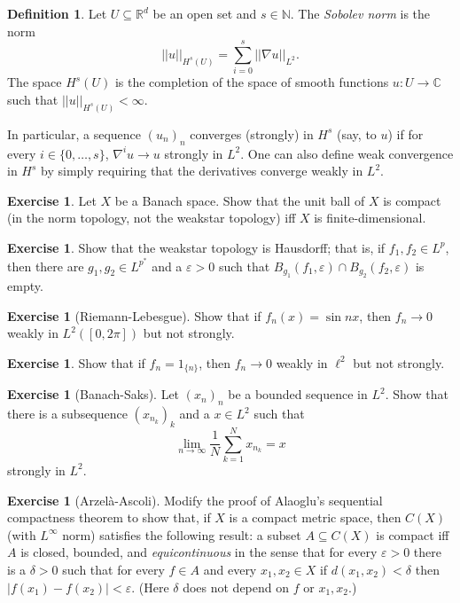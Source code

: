 \documentclass[12pt]{book}
\newcommand{\NN}{\mathbb{N}}
\newcommand{\RR}{\mathbb{R}}
\newcommand{\CC}{\mathbb{C}}
\newcommand{\dfn}[1]{\emph{#1}\index{#1}}
\theoremstyle{definition}
\newtheorem{definition}[theorem]{Definition}
\newtheorem{exercise}[theorem]{Exercise}
\begin{document}
\begin{definition}
Let $U \subseteq \RR^d$ be an open set and $s \in \NN$.
The \dfn{Sobolev norm} is the norm
$$||u||_{H^s(U)} = \sum_{i=0}^s ||\nabla u||_{L^2}.$$
The space $H^s(U)$ is the completion of the space of smooth functions $u: U \to \CC$ such that $||u||_{H^s(U)} < \infty$.
\end{definition}
In particular, a sequence $(u_n)_n$ converges (strongly) in $H^s$ (say, to $u$) if for every $i \in \{0, \dots, s\}$, $\nabla^iu \to u$ strongly in $L^2$.
One can also define weak convergence in $H^s$ by simply requiring that the derivatives converge weakly in $L^2$.

\begin{exercise}
\label{unit ball compactness}
Let $X$ be a Banach space. Show that the unit ball of $X$ is compact (in the norm topology, not the weakstar topology) iff $X$ is finite-dimensional.
\end{exercise}

\begin{exercise}
\label{weakstar is hausdorff}
Show that the weakstar topology is Hausdorff; that is, if $f_1, f_2 \in L^p$, then there are $g_1, g_2 \in L^{p^*}$ and a $\varepsilon > 0$ such that $B_{g_1}(f_1, \varepsilon) \cap B_{g_2}(f_2, \varepsilon)$ is empty.
\end{exercise}

\begin{exercise}[Riemann-Lebesgue]
Show that if $f_n(x) = \sin nx$, then $f_n \to 0$ weakly in $L^2([0, 2\pi])$ but not strongly.
\end{exercise}

\begin{exercise}
Show that if $f_n = 1_{\{n\}}$, then $f_n \to 0$ weakly in $\ell^2$ but not strongly.
\end{exercise}

\begin{exercise}[Banach-Saks]
Let $(x_n)_n$ be a bounded sequence in $L^2$. Show that there is a subsequence $(x_{n_k})_k$ and a $x \in L^2$ such that
$$\lim_{n \to \infty} \frac{1}{N} \sum_{k=1}^N x_{n_k} = x$$
strongly in $L^2$.
\end{exercise}

\begin{exercise}[Arzel\`a-Ascoli]
\label{Ascoli}
Modify the proof of Alaoglu's sequential compactness theorem to show that, if $X$ is a compact metric space, then $C(X)$ (with $L^\infty$ norm) satisfies the following result: a subset $A \subseteq C(X)$ is compact iff $A$ is closed, bounded, and \dfn{equicontinuous} in the sense that for every $\varepsilon > 0$ there is a $\delta > 0$ such that for every $f \in A$ and every $x_1,x_2 \in X$ if $d(x_1, x_2) < \delta$ then $|f(x_1) - f(x_2)| < \varepsilon$. (Here $\delta$ does not depend on $f$ or $x_1, x_2$.)
\end{exercise}
\end{document}
